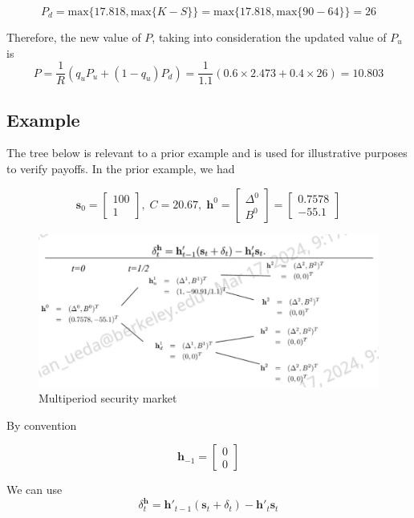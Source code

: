\documentclass[11pt]{article}
\begin{document}
\[
P_d = \text{max}\{17.818, \text{max}\{K - S\}\}
= \text{max}\{17.818, \text{max}\{90 - 64\}\}
= 26
\]

Therefore, the new value of $P$, taking into consideration the updated value of $P_u$ is
\[
P = \frac{1}{R}(q_u P_u + (1-q_u) P_d)
= \frac{1}{1.1}(0.6 \times 2.473 + 0.4 \times 26)
= 10.803
\]

\subsection{Example}

The tree below is relevant to a prior example and is used for illustrative purposes to verify
payoffs.
In the prior example, we had 

\[
\boldsymbol{s}_0 = \begin{bmatrix} 100 \\ 1 \end{bmatrix}, \; 
C = 20.67, \; 
\boldsymbol{h}^0 = 
\begin{bmatrix}
    \Delta^0 \\ 
    B^0    
\end{bmatrix} =
\begin{bmatrix}
    0.7578 \\ 
    -55.1    
\end{bmatrix}
\]
\begin{figure}[H] 
    \centering 
    \includegraphics[width=5in]{imgs/multiperiod_security_example.png}
    \caption{Multiperiod security market} 
\end{figure}

By convention 

\[
\boldsymbol{h}_{-1} 
= \begin{bmatrix}
    0 \\
    0
\end{bmatrix}
\]


We can use 
\[
    \delta_t^{\boldsymbol{h}} = \boldsymbol{h}'_{t-1}(\boldsymbol{s}_t + \delta_t) - 
    \boldsymbol{h}'_{t}\boldsymbol{s}_t
\]
\end{document}
